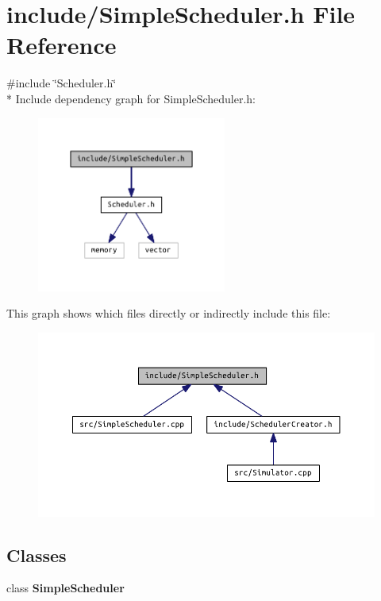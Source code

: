 \section{include/\+Simple\+Scheduler.h File Reference}
\label{_simple_scheduler_8h}
{\ttfamily \#include \char`\"{}Scheduler.\+h\char`\"{}}\\*
Include dependency graph for Simple\+Scheduler.\+h\+:
\nopagebreak
\begin{figure}[H]
\begin{center}
\leavevmode
\includegraphics[width=176pt]{_simple_scheduler_8h__incl}
\end{center}
\end{figure}
This graph shows which files directly or indirectly include this file\+:
\nopagebreak
\begin{figure}[H]
\begin{center}
\leavevmode
\includegraphics[width=322pt]{_simple_scheduler_8h__dep__incl}
\end{center}
\end{figure}
\subsection*{Classes}
\begin{DoxyCompactItemize}
\item 
class {\bf Simple\+Scheduler}
\end{DoxyCompactItemize}
